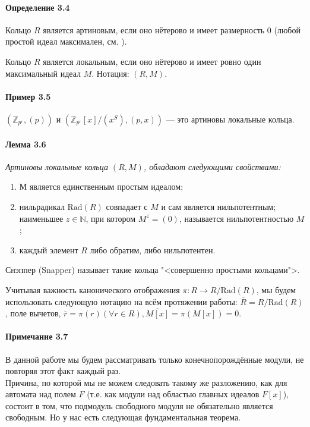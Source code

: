 \documentclass[a4paper,12pt]{article}
\newcommand{\Rad}{\text{Rad}}
\begin{document}
\paragraph{Определение 3.4}
Кольцо $R$ является артиновым, если оно нётерово и имеет размерность 0 (любой простой идеал максимален, см. \cite{bib1}).

Кольцо $R$ является локальным, если оно нётерово и имеет ровно один максимальный идеал $M$. Нотация: $(R,M)$.

\paragraph{Пример 3.5}
$(\mathbb{Z}_{p^r}, (p))$ и $(\mathbb{Z}_{p^r}[x]/(x^S), (p,x))$ --- это артиновы локальные кольца.

\paragraph{Лемма 3.6}{\itshape
Артиновы локальные кольца $(R,M)$, обладают следующими свойствами:
}

\renewcommand{\labelenumi}{(\asbuk{enumi})}
\begin{enumerate}
	\item М является единственным простым идеалом;
	\item нильрадикал $\Rad(R)$ совпадает с $M$ и сам является нильпотентным; наименьшее $z \in \mathbb{N}$, при котором $M^z = (0)$, называется нильпотентностью $M$;
	\item каждый элемент $R$ либо обратим, либо нильпотентен.
\end{enumerate}

Снэппер (Snapper) \cite{bib11} называет такие кольца "<совершенно простыми кольцами">.

Учитывая важность канонического отображения $\pi : R \rightarrow R / \Rad(R)$, мы будем использовать следующую нотацию на всём протяжении работы: $\overline{R} = R / \Rad(R)$, поле вычетов, $\overline{r} = \pi (r) (\forall r \in R), \overline{M[x]} = \pi (M[x]) = 0$.

\paragraph{Примечание 3.7}
В данной работе мы будем рассматривать только конечнопорождённые модули, не повторяя этот факт каждый раз.\\

Причина, по которой мы не можем следовать такому же разложению, как для автомата над полем $F$ (т.е. как модули над областью главных идеалов $F[x]$), состоит в том, что подмодуль свободного модуля не обязательно является свободным. Но у нас есть следующая фундаментальная теорема.
\end{document}
